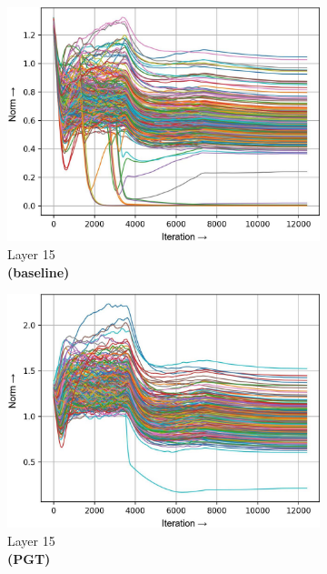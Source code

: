 \documentclass[runningheads]{llncs}
\begin{document}
\begin{figure}[t]
\captionsetup{font=footnotesize}
\begin{subfigure}[t]{0.16\textwidth}
\includegraphics[width=\textwidth]{trimmed/baseline-w-layer-5-3}
\caption{Layer 15\\ \textbf{(baseline)}
}\end{subfigure}
\begin{subfigure}[t]{0.16\textwidth}
\includegraphics[width=\textwidth]{trimmed/pgt-w-layer-5-3}
\caption{Layer 15\\ \textbf{(PGT)}
}\end{subfigure}
\begin{subfigure}[t]{0.16\textwidth}

\end{subfigure}
\end{figure}
\end{document}
